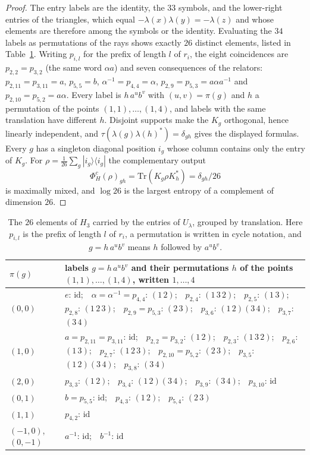 \documentclass[11pt,a4paper]{article}
\theoremstyle{plain}
\theoremstyle{definition}
\theoremstyle{remark}
\begin{document}
\begin{proof}
The entry labels are the identity, the $33$ symbols, and the lower-right entries of the triangles, which equal
$-\lambda(x)\lambda(y)=-\lambda(z)$ and whose elements are therefore among the symbols or the identity. Evaluating the $34$ labels as permutations of the rays
shows exactly $26$ distinct elements, listed in Table~\ref{tab:labels}. Writing $p_{i,l}$ for the prefix of length $l$ of $r_i$,
the eight coincidences are $p_{2,2}=p_{3,2}$ (the same word $\alpha a$) and seven consequences of the relators:
$p_{2,11}=p_{3,11}=a$, $p_{5,5}=b$, $\alpha^{-1}=p_{4,4}=\alpha$, $p_{2,9}=p_{5,3}=a\alpha a^{-1}$ and $p_{2,10}=p_{5,2}=a\alpha$. Every
label is $h\,a^ub^v$ with $(u,v)=\pi(g)$ and $h$ a permutation of the points $(1,1),\dots,(1,4)$, and labels with the same
translation have different $h$. Disjoint supports make the $K_g$ orthogonal, hence linearly
independent, and $\tau(\lambda(g)\lambda(h)^*)=\delta_{gh}$ gives the displayed formulas. Every $g$ has a singleton
diagonal position $i_g$ whose column contains only the entry of $K_g$. For $\rho=\frac1{26}\sum_g|i_g\rangle\langle i_g|$
the complementary output
\[
\Phi_H^c(\rho)_{gh}=\mathrm{Tr}(K_g\rho K_h^*)=\delta_{gh}/26
\]
is maximally mixed, and $\log26$ is the largest entropy of a complement of dimension $26$.
\end{proof}

\begin{table}[t]
\centering
\small
\begin{tabular}{@{}lp{12.2cm}@{}}
\toprule
$\pi(g)$ & labels $g=h\,a^ub^v$ and their permutations $h$ of the points $(1,1),\dots,(1,4)$, written $1,\dots,4$\\
\midrule
$(0,0)$ & $e$: $\mathrm{id}$;\ \ $\alpha=\alpha^{-1}=p_{4,4}$: $(1\,2)$;\ \ $p_{2,4}$: $(1\,3\,2)$;\ \ $p_{2,5}$: $(1\,3)$;\ \ $p_{2,8}$: $(1\,2\,3)$;\ \
$p_{2,9}=p_{5,3}$: $(2\,3)$;\ \ $p_{3,6}$: $(1\,2)(3\,4)$;\ \ $p_{3,7}$: $(3\,4)$\\
$(1,0)$ & $a=p_{2,11}=p_{3,11}$: $\mathrm{id}$;\ \ $p_{2,2}=p_{3,2}$: $(1\,2)$;\ \ $p_{2,3}$: $(1\,3\,2)$;\ \ $p_{2,6}$: $(1\,3)$;\ \
$p_{2,7}$: $(1\,2\,3)$;\ \ $p_{2,10}=p_{5,2}$: $(2\,3)$;\ \ $p_{3,5}$: $(1\,2)(3\,4)$;\ \ $p_{3,8}$: $(3\,4)$\\
$(2,0)$ & $p_{3,3}$: $(1\,2)$;\ \ $p_{3,4}$: $(1\,2)(3\,4)$;\ \ $p_{3,9}$: $(3\,4)$;\ \ $p_{3,10}$: $\mathrm{id}$\\
$(0,1)$ & $b=p_{5,5}$: $\mathrm{id}$;\ \ $p_{4,3}$: $(1\,2)$;\ \ $p_{5,4}$: $(2\,3)$\\
$(1,1)$ & $p_{4,2}$: $\mathrm{id}$\\
$(-1,0)$, $(0,-1)$ & $a^{-1}$: $\mathrm{id}$;\ \ $b^{-1}$: $\mathrm{id}$\\
\bottomrule
\end{tabular}
\caption{The $26$ elements of $H_3$ carried by the entries of $U_\lambda$, grouped by translation. Here $p_{i,l}$ is the prefix of length
$l$ of $r_i$, a permutation is written in cycle notation, and $g=h\,a^ub^v$ means $h$ followed by $a^ub^v$.}
\label{tab:labels}
\end{table}
\end{document}
